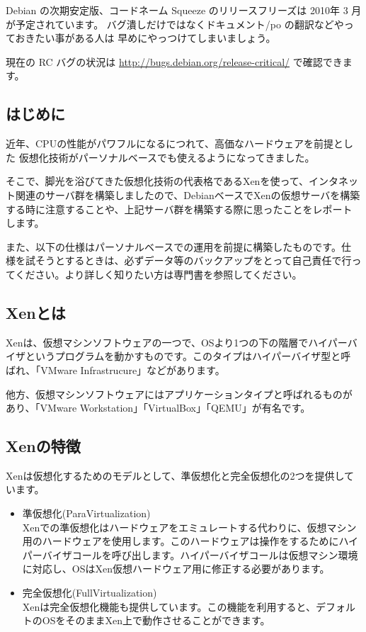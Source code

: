 \documentclass[mingoth,a4paper]{jsarticle}
\begin{document}
Debian の次期安定版、コードネーム Squeeze のリリースフリーズは
2010年 3 月が予定されています。
バグ潰しだけではなくドキュメント/po の翻訳などやっておきたい事がある人は
早めにやっつけてしまいましょう。

現在の RC バグの状況は
\url{http://bugs.debian.org/release-critical/} で確認できます。

\clearpage
{}

\subsection{はじめに}
近年、CPUの性能がパワフルになるにつれて、高価なハードウェアを前提とした
仮想化技術がパーソナルベースでも使えるようになってきました。

そこで、脚光を浴びてきた仮想化技術の代表格であるXenを使って、インタネッ
ト関連のサーバ群を構築しましたので、DebianベースでXenの仮想サーバを構築
する時に注意することや、上記サーバ群を構築する際に思ったことをレポート
します。

また、以下の仕様はパーソナルベースでの運用を前提に構築したものです。仕
様を試そうとするときは、必ずデータ等のバックアップをとって自己責任で行っ
てください。より詳しく知りたい方は専門書を参照してください。

\subsection{Xenとは}
Xenは、仮想マシンソフトウェアの一つで、OSより1つの下の階層でハイパーバ
イザというプログラムを動かすものです。このタイプはハイパーバイザ型と呼
ばれ、「VMware Infrastrucure」などがあります。

他方、仮想マシンソフトウェアにはアプリケーションタイプと呼ばれるものが
あり、「VMware Workstation」「VirtualBox」「QEMU」が有名です。

\subsection{Xenの特徴}
Xenは仮想化するためのモデルとして、準仮想化と完全仮想化の2つを提供しています。
\begin{itemize}
\item 準仮想化(ParaVirtualization)\\
Xenでの準仮想化はハードウェアをエミュレートする代わりに、仮想マシン用のハードウェアを使用します。このハードウェアは操作をするためにハイパーバイザコールを呼び出します。ハイパーバイザコールは仮想マシン環境に対応し、OSはXen仮想ハードウェア用に修正する必要があります。

\item 完全仮想化(FullVirtualization)\\
Xenは完全仮想化機能も提供しています。この機能を利用すると、デフォルトのOSをそのままXen上で動作させることができます。
\end{itemize}
\end{document}
